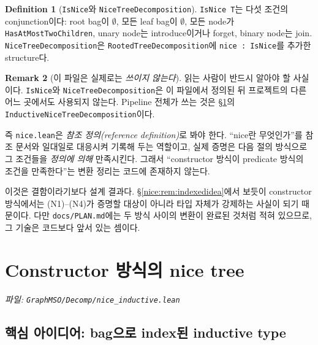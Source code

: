 \documentclass[11pt]{article}
\theoremstyle{definition}
\newtheorem{definition}{Definition}[section]
\newtheorem{remark}[definition]{Remark}
\theoremstyle{plain}
\newcommand{\lean}[1]{\texttt{#1}}
\newcommand{\leanfile}[1]{\texttt{#1}}
\begin{document}
\begin{definition}[\lean{IsNice}와 \lean{NiceTreeDecomposition}]
\label{nice:def:isnice}
\lean{IsNice T}는 다섯 조건의 conjunction이다: root bag이 $\emptyset$,
모든 leaf bag이 $\emptyset$, 모든 node가 \lean{HasAtMostTwoChildren},
unary node는 introduce이거나 forget, binary node는 join.
\lean{NiceTreeDecomposition}은 \lean{RootedTreeDecomposition}에
\lean{nice : IsNice}를 추가한 structure다.
\end{definition}

\begin{remark}[이 파일은 실제로는 \emph{쓰이지 않는다}]
\label{nice:rem:niceunused}
읽는 사람이 반드시 알아야 할 사실이다. \lean{IsNice}와
\lean{NiceTreeDecomposition}은 이 파일에서 정의된 뒤 프로젝트의 다른 어느
곳에서도 사용되지 않는다. Pipeline 전체가 쓰는 것은
\S\ref{nice:sec:inductive}의 \lean{InductiveNiceTreeDecomposition}이다.

즉 \leanfile{nice.lean}은 \emph{참조 정의(reference definition)}로 봐야 한다.
``nice란 무엇인가''를 참조 문서와 일대일로 대응시켜 기록해 두는 역할이고,
실제 증명은 다음 절의 방식으로 그 조건들을 \emph{정의에 의해} 만족시킨다.
그래서 ``constructor 방식이 predicate 방식의 조건을 만족한다''는 변환 정리는
코드에 존재하지 않는다.

이것은 결함이라기보다 설계 결과다. \S\ref{nice:rem:indexedidea}에서 보듯이
constructor 방식에서는 (N1)--(N4)가 증명할 대상이 아니라 타입 자체가 강제하는
사실이 되기 때문이다. 다만 \leanfile{docs/PLAN.md}에는 두 방식 사이의 변환이
완료된 것처럼 적혀 있으므로, 그 기술은 코드보다 앞서 있는 셈이다.
\end{remark}

\section{Constructor 방식의 nice tree}
\label{nice:sec:inductive}

\emph{파일: \leanfile{GraphMSO/Decomp/nice\_inductive.lean}}

\subsection{핵심 아이디어: bag으로 index된 inductive type}
\end{document}
